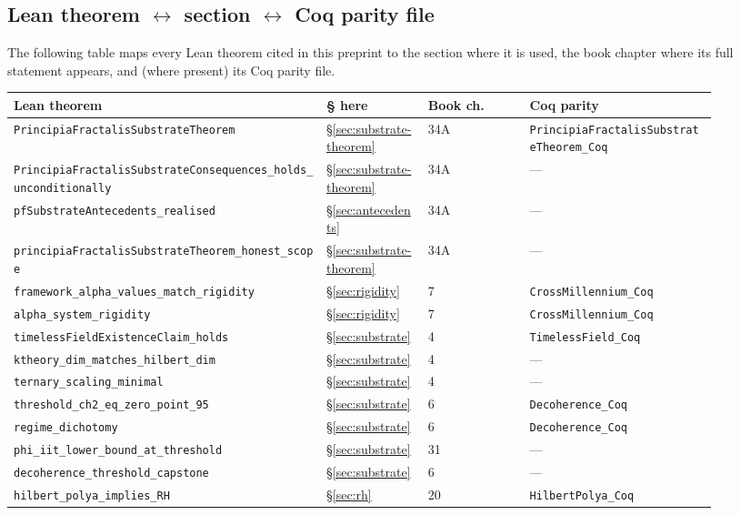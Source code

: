 \documentclass[11pt,a4paper]{article}
\theoremstyle{definition}
\theoremstyle{remark}
\newcommand{\lean}[1]{\texttt{\small #1}}
\begin{document}
\subsection{Lean theorem $\leftrightarrow$ section $\leftrightarrow$ Coq parity file}

The following table maps every Lean theorem cited in this preprint
to the section where it is used, the book chapter where its
full statement appears, and (where present) its Coq parity file.

\begin{longtable}{p{0.40\linewidth} p{0.13\linewidth} p{0.13\linewidth} p{0.24\linewidth}}
\toprule
\textbf{Lean theorem} & \textbf{\S{} here} & \textbf{Book ch.} & \textbf{Coq parity} \\
\midrule
\endhead
\lean{PrincipiaFractalisSubstrateTheorem} & \S\ref{sec:substrate-theorem} & 34A & \lean{PrincipiaFractalisSubstrateTheorem\_Coq} \\
\lean{PrincipiaFractalisSubstrateConsequences\_holds\_unconditionally} & \S\ref{sec:substrate-theorem} & 34A & --- \\
\lean{pfSubstrateAntecedents\_realised} & \S\ref{sec:antecedents} & 34A & --- \\
\lean{principiaFractalisSubstrateTheorem\_honest\_scope} & \S\ref{sec:substrate-theorem} & 34A & --- \\
\lean{framework\_alpha\_values\_match\_rigidity} & \S\ref{sec:rigidity} & 7 & \lean{CrossMillennium\_Coq} \\
\lean{alpha\_system\_rigidity} & \S\ref{sec:rigidity} & 7 & \lean{CrossMillennium\_Coq} \\
\lean{timelessFieldExistenceClaim\_holds} & \S\ref{sec:substrate} & 4 & \lean{TimelessField\_Coq} \\
\lean{ktheory\_dim\_matches\_hilbert\_dim} & \S\ref{sec:substrate} & 4 & --- \\
\lean{ternary\_scaling\_minimal} & \S\ref{sec:substrate} & 4 & --- \\
\lean{threshold\_ch2\_eq\_zero\_point\_95} & \S\ref{sec:substrate} & 6 & \lean{Decoherence\_Coq} \\
\lean{regime\_dichotomy} & \S\ref{sec:substrate} & 6 & \lean{Decoherence\_Coq} \\
\lean{phi\_iit\_lower\_bound\_at\_threshold} & \S\ref{sec:substrate} & 31 & --- \\
\lean{decoherence\_threshold\_capstone} & \S\ref{sec:substrate} & 6 & --- \\
\lean{hilbert\_polya\_implies\_RH} & \S\ref{sec:rh} & 20 & \lean{HilbertPolya\_Coq} \\

\end{longtable}
\end{document}
